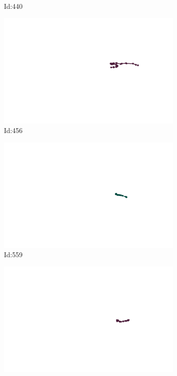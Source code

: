 \documentclass[12pt,twoside]{report}
\begin{document}
\begin{figure}
\begin{subfigure}[b]{0.20\textwidth}
\caption{Id:440}
\end{subfigure}
\begin{subfigure}[b]{0.20\textwidth}
\centering
\includegraphics[width=\textwidth]{../trajectories/456.png}
\caption{Id:456}
\end{subfigure}
\begin{subfigure}[b]{0.20\textwidth}
\centering
\includegraphics[width=\textwidth]{../trajectories/559.png}
\caption{Id:559}
\end{subfigure}
\begin{subfigure}[b]{0.20\textwidth}
\centering
\includegraphics[width=\textwidth]{../trajectories/578.png}

\end{subfigure}
\end{figure}
\end{document}
